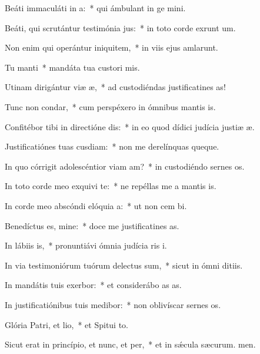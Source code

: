 \item Beáti immaculáti in a:~* qui ámbulant in ge mini.
\item Beáti, qui scrutántur testimónia jus:~* in toto corde exrunt um.
\item Non enim qui operántur iniquitem,~* in viis ejus amlarunt.
\item Tu manti~* mandáta tua custori mis.
\item Utinam dirigántur viæ æ,~* ad custodiéndas justificatines as!
\item Tunc non condar,~* cum perspéxero in ómnibus mantis is.
\item Confitébor tibi in directióne dis:~* in eo quod dídici judícia justiæ æ.
\item Justificatiónes tuas cusdiam:~* non me derelínquas queque.
\item In quo córrigit adolescéntior viam am?~* in custodiéndo sernes os.
\item In toto corde meo exquivi te:~* ne repéllas me a mantis is.
\item In corde meo abscóndi elóquia a:~* ut non cem bi.
\item Benedíctus es, mine:~* doce me justificatines as.
\item In lábiis is,~* pronuntiávi ómnia judícia ris i.
\item In via testimoniórum tuórum delectus sum,~* sicut in ómni ditiis.
\item In mandátis tuis exerbor:~* et considerábo as as.
\item In justificatiónibus tuis medibor:~* non oblivíscar sernes os.
\item Glória Patri, et lio,~* et Spitui to.
\item Sicut erat in princípio, et nunc, et per,~* et in sǽcula sæcurum. men.
